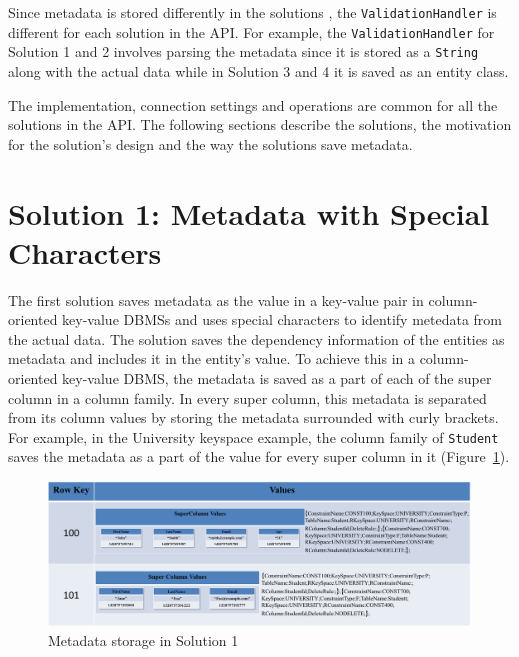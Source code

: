 		
		Since metadata is stored differently in the solutions , the
		\texttt{ValidationHandler} is different for each solution in the \ac{API}. For
		example,  the \texttt{ValidationHandler} for Solution 1 and 2 involves parsing
		the metadata  since it is stored as a \texttt{String} along
		with the actual data while in Solution 3 and 4 it is saved as an entity class.
		
		The implementation,  connection settings and operations 
		are common for all the solutions in the \ac{API}.  
		The following sections describe the solutions,  the motivation for the
		solution's design and the way the solutions save metadata. 
		
	
\section{Solution 1:  Metadata with Special Characters}\label{s:sol1}

	
	The first solution saves metadata as the value in a key-value pair  in
	column-oriented key-value \acp{DBMS} and uses special characters to identify
	metedata from the actual data.
	The solution saves the dependency information of the entities as
	metadata and includes it in the entity's value. To achieve this in a column-oriented key-value
	\ac{DBMS}, the metadata is saved as a part of each of the super column  in a column family.
	In every super column,  this metadata is separated from its column values
	 by storing the metadata surrounded with curly brackets. For example,  in the
	 University keyspace example,  the column family of \texttt{Student} saves
	 the metadata as a part of the value  for every  super
	 column in it (Figure~\ref{f:sol1-Student-md}).
	 
	\begin{figure}[H]
		\centering
		\includegraphics[width=1\textwidth]{./figure/Solutions/Solution1-Student-MD.png}
		\caption{Metadata storage in Solution 1}\label{f:sol1-Student-md}
	\end{figure}
	 
